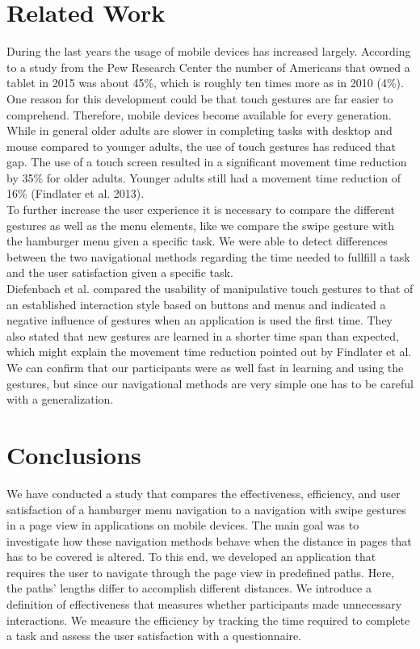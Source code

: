 \documentclass{sig-alternate-05-2015}
\begin{document}
\section{Related Work}
During the last years the usage of mobile devices has increased largely. According to a study from the Pew Research Center
the number of Americans that owned a tablet in 2015 was about 45\%, which is roughly ten times more as in 2010 (4\%). One reason
for this development could be that touch gestures are far easier to comprehend. Therefore, mobile devices become available for every generation. While in general older adults are slower in completing tasks with desktop and mouse compared to younger adults, the use of touch gestures has reduced that gap. The use of a touch screen resulted in a significant movement time reduction by 35\% for older adults. Younger adults still had a movement time reduction of 16\% (Findlater
et al. 2013).\\ To further increase the user experience it is necessary to compare the different gestures as well as the menu elements, like we compare the swipe gesture with the hamburger menu given a specific task. We were able to detect differences between the two navigational methods regarding the time needed to fullfill a task and the user satisfaction given a specific task.\\ Diefenbach et al. compared the usability of manipulative touch gestures to that of an established interaction style based on buttons and menus and indicated a negative influence of gestures when an application is used the first time. They also stated that new gestures are learned in a shorter time span than expected, which might explain the movement time reduction pointed out by Findlater
et al. We can confirm that our participants were as well fast in learning and using the gestures, but since our navigational methods are very simple one has to be careful with a generalization.
\section{Conclusions}
We have conducted a study that compares the effectiveness, efficiency, and user satisfaction of a hamburger menu navigation to a navigation with swipe
gestures in a page view in applications on mobile devices. The main goal was to investigate how these navigation methods behave when the distance in pages
that has to be covered is altered. To this end, we developed an application that requires the user to navigate through the page view in predefined
paths. Here, the paths' lengths differ to accomplish different distances. We introduce a definition of effectiveness that measures whether participants made unnecessary interactions. We measure the efficiency by tracking the time
required to complete a task and assess the user satisfaction with a questionnaire.
\end{document}
